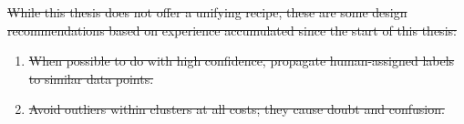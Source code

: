 \documentclass[12pt,twoside]{mitthesis}
\providecommand{\DIFdeltex}[1]{{\protect\color{red}\sout{#1}}}                      %
\providecommand{\DIFdel}[1]{\texorpdfstring{\DIFdeltex{#1}}{}} %
\begin{document}
\DIFdel{While this thesis does not offer a unifying recipe, these are some design recommendations based on experience accumulated since the start of this thesis:
}%
 \begin{enumerate} %
\item%
\DIFdel{When possible to do with high confidence, propagate human-assigned labels to similar data points.%
}%
\item%
\DIFdel{Avoid outliers within clusters at all costs; they cause doubt and confusion. 
}
 \end{enumerate} %






\end{document}
